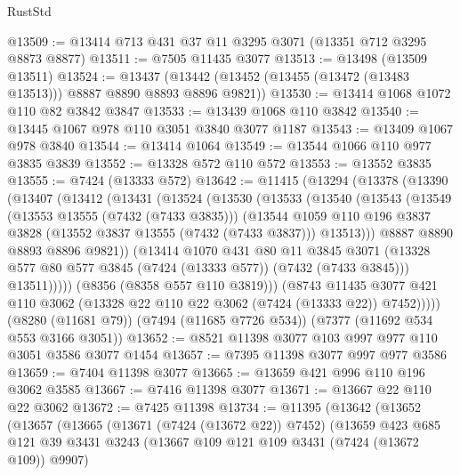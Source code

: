 \begin{lexlean}{RustStd}
\begin{coremodule}
{\begin{coremodule}
{{{{{{{{{{{{{{{{{{{{{{{{{{{{{{{{@13509 := @13414 @713 @431 @37 @11 @3295 @3071 (@13351 @712 @3295 @8873 @8877)
@13511 := @7505 @11435 @3077
@13513 := @13498 (@13509 @13511)
@13524 := @13437 (@13442 (@13452 (@13455 (@13472 (@13483 @13513))) @8887 @8890 @8893 @8896 @9821))
@13530 := @13414 @1068 @1072 @110 @82 @3842 @3847
@13533 := @13439 @1068 @110 @3842
@13540 := @13445 @1067 @978 @110 @3051 @3840 @3077 @1187
@13543 := @13409 @1067 @978 @3840
@13544 := @13414 @1064
@13549 := @13544 @1066 @110 @977 @3835 @3839
@13552 := @13328 @572 @110 @572
@13553 := @13552 @3835
@13555 := @7424 (@13333 @572)
@13642 := @11415
    (@13294
      (@13378
        (@13390
          (@13407
            (@13412
              (@13431
                (@13524
                  (@13530
                    (@13533
                      (@13540
                        (@13543
                          (@13549
                            (@13553 @13555 (@7432 (@7433 @3835)))
                            (@13544
                              @1059
                              @110
                              @196
                              @3837
                              @3828
                              (@13552 @3837 @13555 (@7432 (@7433 @3837)))
                              @13513)))
                        @8887
                        @8890
                        @8893
                        @8896
                        @9821))
                    (@13414
                      @1070
                      @431
                      @80
                      @11
                      @3845
                      @3071
                      (@13328 @577 @80 @577 @3845 (@7424 (@13333 @577)) (@7432 (@7433 @3845)))
                      @13511)))))
            (@8356 (@8358 @557 @110 @3819)))
          (@8743
            @11435
            @3077
            @421
            @110
            @3062
            (@13328 @22 @110 @22 @3062 (@7424 (@13333 @22)) @7452)))))
    (@8280 (@11681 @79))
    (@7494 (@11685 @7726 @534))
    (@7377 (@11692 @534 @553 @3166 @3051))
@13652 := @8521 @11398 @3077 @103 @997 @977 @110 @3051 @3586 @3077 @1454
@13657 := @7395 @11398 @3077 @997 @977 @3586
@13659 := @7404 @11398 @3077
@13665 := @13659 @421 @996 @110 @196 @3062 @3585
@13667 := @7416 @11398 @3077
@13671 := @13667 @22 @110 @22 @3062
@13672 := @7425 @11398
@13734 := @11395
    (@13642
      (@13652
        (@13657
          (@13665
            (@13671 (@7424 (@13672 @22)) @7452)
            (@13659
              @423
              @685
              @121
              @39
              @3431
              @3243
              (@13667 @109 @121 @109 @3431 (@7424 (@13672 @109)) @9907)
}}}}}}}}}}}}}}}}}}}}}}}}}}}}}}}}
\end{coremodule}}
\end{coremodule}
\end{lexlean}
